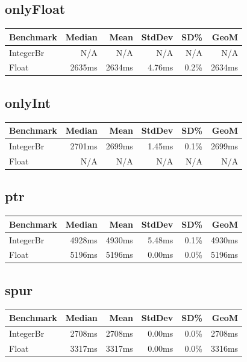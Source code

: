 {\subsection*{onlyFloat}
\begin{tabular}{|l|r|r|r|r|r|}
\hline
\textbf{Benchmark} & \textbf{Median} & \textbf{Mean} & \textbf{StdDev} & \textbf{SD\%} & \textbf{GeoM} \\ \hline
IntegerBr & N/A & N/A & N/A & N/A & N/A \\ \hline
Float & 2635ms & 2634ms & 4.76ms & 0.2\% & 2634ms \\ \hline
\end{tabular}

\subsection*{onlyInt}
\begin{tabular}{|l|r|r|r|r|r|}
\hline
\textbf{Benchmark} & \textbf{Median} & \textbf{Mean} & \textbf{StdDev} & \textbf{SD\%} & \textbf{GeoM} \\ \hline
IntegerBr & 2701ms & 2699ms & 1.45ms & 0.1\% & 2699ms \\ \hline
Float & N/A & N/A & N/A & N/A & N/A \\ \hline
\end{tabular}

\subsection*{ptr}
\begin{tabular}{|l|r|r|r|r|r|}
\hline
\textbf{Benchmark} & \textbf{Median} & \textbf{Mean} & \textbf{StdDev} & \textbf{SD\%} & \textbf{GeoM} \\ \hline
IntegerBr & 4928ms & 4930ms & 5.48ms & 0.1\% & 4930ms \\ \hline
Float & 5196ms & 5196ms & 0.00ms & 0.0\% & 5196ms \\ \hline
\end{tabular}

\subsection*{spur}
\begin{tabular}{|l|r|r|r|r|r|}
\hline
\textbf{Benchmark} & \textbf{Median} & \textbf{Mean} & \textbf{StdDev} & \textbf{SD\%} & \textbf{GeoM} \\ \hline
IntegerBr & 2708ms & 2708ms & 0.00ms & 0.0\% & 2708ms \\ \hline
Float & 3317ms & 3317ms & 0.00ms & 0.0\% & 3316ms \\ \hline
\end{tabular}

}
